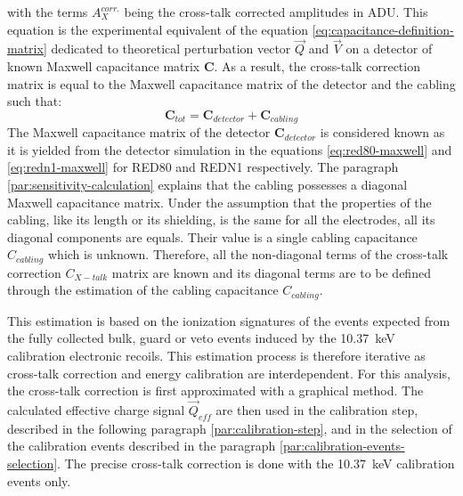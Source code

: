 with the terms $A_X^{corr.}$ being the cross-talk corrected amplitudes in ADU.
This equation is the experimental equivalent of the equation \ref{eq:capacitance-definition-matrix} dedicated to theoretical perturbation vector $\vec{Q}$ and $\vec{V}$ on a detector of known Maxwell capacitance matrix $\bm{C}$. As a result, the cross-talk correction matrix is equal to the Maxwell capacitance matrix of the detector and the cabling such that:
\begin{equation}
\bm{C}_{tot} = \bm{C}_{detector} + \bm{C}_{cabling} 
\end{equation}
The Maxwell capacitance matrix of the detector $\bm{C}_{detector}$ is considered known as it is yielded from the detector simulation in the equations \ref{eq:red80-maxwell} and \ref{eq:redn1-maxwell} for RED80 and REDN1 respectively.
The paragraph \ref{par:sensitivity-calculation} explains that the cabling possesses a diagonal Maxwell capacitance matrix. Under the assumption that the properties of the cabling, like its length or its shielding, is the same for all the electrodes, all its diagonal components are equals. Their value is a single cabling capacitance $C_{cabling}$ which is unknown.
Therefore, all the non-diagonal terms of the cross-talk correction $C_{X-talk}$ matrix are known and its diagonal terms are to be defined through the estimation of the cabling capacitance $C_{cabling}$.

This estimation is based on the ionization signatures of the events expected from the fully collected bulk, guard or veto events induced by the \SI{10.37}{\kilo\eV} calibration electronic recoils. This estimation process is therefore iterative as cross-talk correction and energy calibration are interdependent. 
For this analysis, the cross-talk correction is first approximated with a graphical method. The calculated effective charge signal $\vec{Q}_{eff}$ are then used in the calibration step, described in the following paragraph \ref{par:calibration-step}, and in the selection of the calibration events described in the paragraph \ref{par:calibration-events-selection}. The precise cross-talk correction is done with the \SI{10.37}{\kilo\eV} calibration events only.

